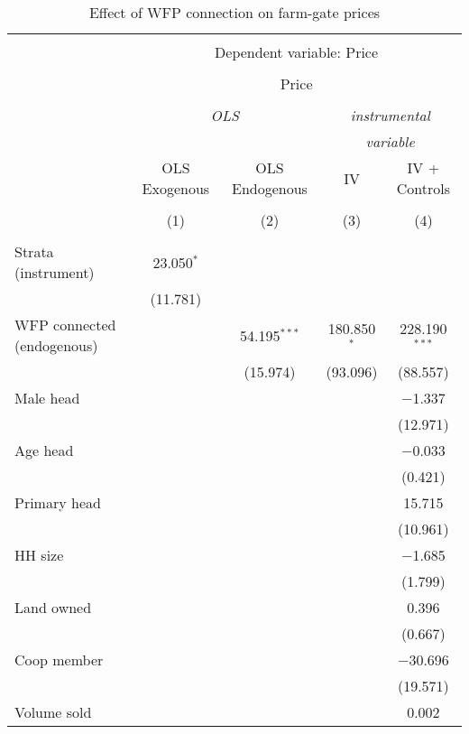 
\begin{table}[!htbp] \centering 
  \caption{Effect of WFP connection on farm-gate prices} 
  \label{tab:wfp_farmer_prices} 
\begin{tabular}{@{\extracolsep{5pt}}lcccc} 
\\[-1.8ex]\hline 
\hline \\[-1.8ex] 
 & \multicolumn{4}{c}{Dependent variable: Price} \\ 
\cline{2-5} 
\\[-1.8ex] & \multicolumn{4}{c}{Price} \\ 
\\[-1.8ex] & \multicolumn{2}{c}{\textit{OLS}} & \multicolumn{2}{c}{\textit{instrumental}} \\ 
 & \multicolumn{2}{c}{\textit{}} & \multicolumn{2}{c}{\textit{variable}} \\ 
 & OLS Exogenous & OLS Endogenous & IV & IV + Controls \\ 
\\[-1.8ex] & (1) & (2) & (3) & (4)\\ 
\hline \\[-1.8ex] 
 Strata (instrument) & 23.050$^{*}$ &  &  &  \\ 
  & (11.781) &  &  &  \\ 
  WFP connected (endogenous) &  & 54.195$^{***}$ & 180.850$^{*}$ & 228.190$^{***}$ \\ 
  &  & (15.974) & (93.096) & (88.557) \\ 
  Male head &  &  &  & $-$1.337 \\ 
  &  &  &  & (12.971) \\ 
  Age head &  &  &  & $-$0.033 \\ 
  &  &  &  & (0.421) \\ 
  Primary head &  &  &  & 15.715 \\ 
  &  &  &  & (10.961) \\ 
  HH size &  &  &  & $-$1.685 \\ 
  &  &  &  & (1.799) \\ 
  Land owned &  &  &  & 0.396 \\ 
  &  &  &  & (0.667) \\ 
  Coop member &  &  &  & $-$30.696 \\ 
  &  &  &  & (19.571) \\ 
  Volume sold &  &  &  & 0.002 \\ 

\end{tabular}
\end{table}
